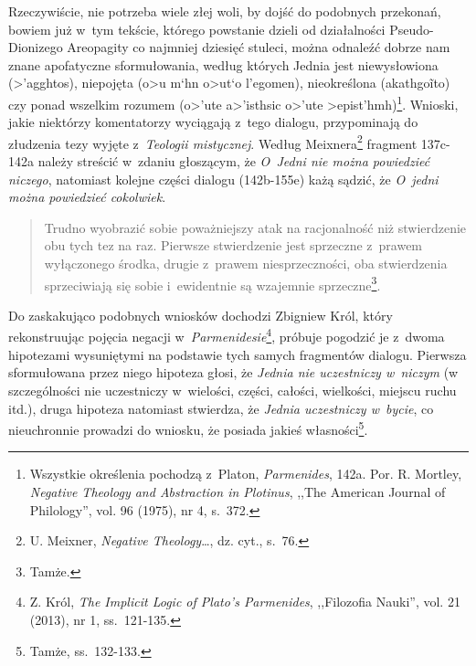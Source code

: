 Rzeczywiście, nie potrzeba wiele złej woli, by dojść do podobnych przekonań, bowiem już w~tym tekście, którego powstanie dzieli od działalności Pseudo-Dionizego Areopagity co najmniej dziesięć stuleci, można odnaleźć dobrze nam znane apofatyczne sformułowania, według których Jednia jest niewysłowiona (\textgreek{>'agghtos}), niepojęta (\textgreek{o>u m`hn o>ut`o l'egomen}), nieokreślona (\textgreek{akathgo\~ito}) czy ponad wszelkim rozumem (\textgreek{o>'ute a>'isthsic o>'ute >epist'hmh})\footnote{Wszystkie określenia pochodzą z~Platon, \textit{Parmenides}, 142a. Por. R. Mortley, \textit{Negative Theology and Abstraction in Plotinus}, ,,The American Journal of Philology'', vol. 96 (1975), nr 4, s.~372.}. Wnioski, jakie niektórzy komentatorzy wyciągają z~tego dialogu, przypominają do złudzenia tezy wyjęte z~\textit{Teologii mistycznej}. Według Meixnera\footnote{U. Meixner, \textit{Negative Theology}\ldots, dz. cyt., s.~76.} fragment 137c-142a należy streścić w~zdaniu głoszącym, że \textit{O~Jedni nie można powiedzieć niczego}, natomiast kolejne części dialogu (142b-155e) każą sądzić, że \textit{O~jedni można powiedzieć cokolwiek}.

\begin{quote}
Trudno wyobrazić sobie poważniejszy atak na racjonalność niż stwierdzenie obu tych tez na raz. Pierwsze stwierdzenie jest sprzeczne z~prawem wyłączonego środka, drugie z~prawem niesprzeczności, oba stwierdzenia sprzeciwiają się sobie i~ewidentnie są wzajemnie sprzeczne\footnote{Tamże.}.
\end{quote}

Do zaskakująco podobnych wniosków dochodzi Zbigniew Król, który rekonstruując pojęcia negacji w~\textit{Parmenidesie}\footnote{Z. Król, \textit{The Implicit Logic of Plato's Parmenides}, ,,Filozofia Nauki'', vol. 21 (2013), nr 1, ss.~121-135.}, próbuje pogodzić je z~dwoma hipotezami wysuniętymi na podstawie tych samych fragmentów dialogu. Pierwsza sformułowana przez niego hipoteza głosi, że \textit{Jednia nie uczestniczy w~niczym} (w szczególności nie uczestniczy w~wielości, części, całości, wielkości, miejscu ruchu itd.), druga hipoteza natomiast stwierdza, że \textit{Jednia uczestniczy w~bycie}, co nieuchronnie prowadzi do wniosku, że posiada jakieś własności\footnote{Tamże, ss.~132-133.}.

